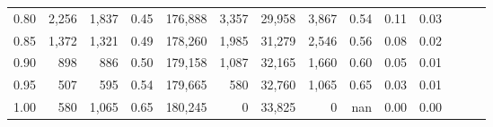 \begin{tabular}{rrrrrrrrrrrrrr}
0.80 &   2,256 &  1,837 &  0.45 &  176,888 &    3,357 &  29,958 &   3,867 &  0.54 &  0.11 &      0.03 \\
0.85 &   1,372 &  1,321 &  0.49 &  178,260 &    1,985 &  31,279 &   2,546 &  0.56 &  0.08 &      0.02 \\
0.90 &     898 &    886 &  0.50 &  179,158 &    1,087 &  32,165 &   1,660 &  0.60 &  0.05 &      0.01 \\
0.95 &     507 &    595 &  0.54 &  179,665 &      580 &  32,760 &   1,065 &  0.65 &  0.03 &      0.01 \\
1.00 &     580 &  1,065 &  0.65 &  180,245 &        0 &  33,825 &       0 &   nan &  0.00 &      0.00 \\
\bottomrule
\end{tabular}
